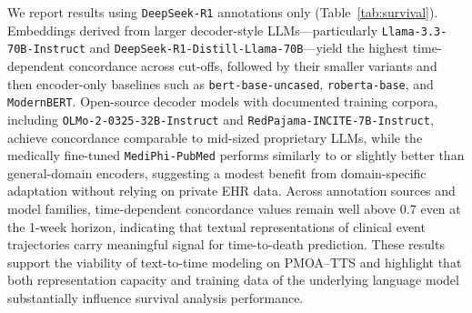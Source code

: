 \documentclass[pdflatex,sn-mathphys-num]{sn-jnl}%
\theoremstyle{thmstyleone}%
\theoremstyle{thmstyletwo}%
\theoremstyle{thmstylethree}%
\begin{document}
We report results using \texttt{DeepSeek-R1} annotations only (Table~\ref{tab:survival}). Embeddings derived from larger decoder-style LLMs—particularly \texttt{Llama-3.3-70B-Instruct} and \texttt{DeepSeek-R1-Distill-Llama-70B}—yield the highest time-dependent concordance across cut-offs, followed by their smaller variants and then encoder-only baselines such as \texttt{bert-base-uncased}, \texttt{roberta-base}, and \texttt{ModernBERT}. Open-source decoder models with documented training corpora, including \texttt{OLMo-2-0325-32B-Instruct} and \texttt{RedPajama-INCITE-7B-Instruct}, achieve concordance comparable to mid-sized proprietary LLMs, while the medically fine-tuned \texttt{MediPhi-PubMed} performs similarly to or slightly better than general-domain encoders, suggesting a modest benefit from domain-specific adaptation without relying on private EHR data. Across annotation sources and model families, time-dependent concordance values remain well above 0.7 even at the 1-week horizon, indicating that textual representations of clinical event trajectories carry meaningful signal for time-to-death prediction. These results support the viability of text-to-time modeling on PMOA--TTS and highlight that both representation capacity and training data of the underlying language model substantially influence survival analysis performance.

% 
\end{document}
